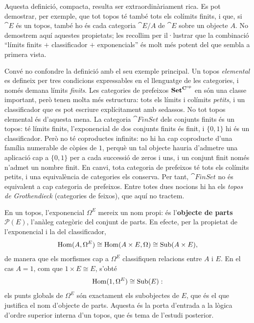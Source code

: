 Aquesta definició, compacta, resulta ser extraordinàriament rica. Es pot demostrar, per exemple, que tot topos té també tots els colímits finits, i que, si $\cat{E}$ és un topos, també ho és cada categoria $\cat{E}/A$ de $\cat{E}$ sobre un objecte $A$. No demostrem aquí aquestes propietats; les recollim per il·lustrar que la combinació \enquote{límits finits $+$ classificador $+$ exponencials} és molt més potent del que sembla a primera vista.

\begin{observacio}\label{obs:elemental-prefeixos}
Convé no confondre la definició amb el seu exemple principal. Un topos \emph{elemental} es defineix per tres condicions expressables en el llenguatge de les categories, i només demana límits \emph{finits}. Les categories de prefeixos $\mathbf{Set}^{\mathbf{C}^{\mathrm{op}}}$ en són una classe important, però tenen molta més estructura: tots els límits i colímits \emph{petits}, i un classificador que es pot escriure explícitament amb sedassos. No tot topos elemental és d'aquesta mena. La categoria $\cat{FinSet}$ dels conjunts finits és un topos: té límits finits, l'exponencial de dos conjunts finits és finit, i $\{0,1\}$ hi és un classificador. Però no té coproductes infinits: no hi ha cap coproducte d'una família numerable de còpies de $1$, perquè un tal objecte hauria d'admetre una aplicació cap a $\{0,1\}$ per a cada successió de zeros i uns, i un conjunt finit només n'admet un nombre finit. En canvi, tota categoria de prefeixos té tots els colímits petits, i una equivalència de categories els conserva. Per tant, $\cat{FinSet}$ no és equivalent a cap categoria de prefeixos. Entre totes dues nocions hi ha els \emph{topos de Grothendieck} (categories de feixos), que aquí no tractem.
\end{observacio}

\begin{observacio}
En un topos, l'exponencial $\Omega^{E}$ mereix un nom propi: és l'\textbf{objecte de parts} $\mathcal{P}(E)$, l'anàleg categòric del conjunt de parts. En efecte, per la propietat de l'exponencial i la del classificador,
\[
\operatorname{Hom}(A,\Omega^{E})\cong\operatorname{Hom}(A\times E,\Omega)\cong\operatorname{Sub}(A\times E),
\]
de manera que els morfismes cap a $\Omega^{E}$ classifiquen relacions entre $A$ i $E$. En el cas $A=1$, com que $1\times E\cong E$, s'obté
\[
\operatorname{Hom}(1,\Omega^{E})\cong\operatorname{Sub}(E):
\]
els punts globals de $\Omega^{E}$ són exactament els subobjectes de $E$, que és el que justifica el nom d'objecte de parts. Aquesta és la porta d'entrada a la lògica d'ordre superior interna d'un topos, que és tema de l'estudi posterior.
\end{observacio}

